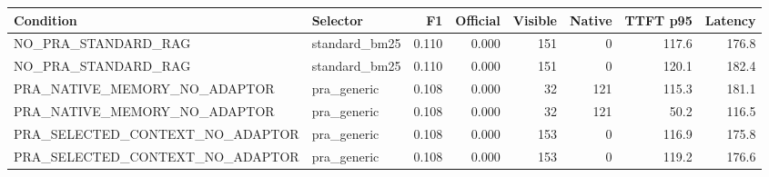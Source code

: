 \begin{tabular}{llrrrrrr}
\toprule
Condition & Selector & F1 & Official & Visible & Native & TTFT p95 & Latency \\
\midrule
NO\_PRA\_STANDARD\_RAG & standard\_bm25 & 0.110 & 0.000 & 151 & 0 & 117.6 & 176.8 \\
NO\_PRA\_STANDARD\_RAG & standard\_bm25 & 0.110 & 0.000 & 151 & 0 & 120.1 & 182.4 \\
PRA\_NATIVE\_MEMORY\_NO\_ADAPTOR & pra\_generic & 0.108 & 0.000 & 32 & 121 & 115.3 & 181.1 \\
PRA\_NATIVE\_MEMORY\_NO\_ADAPTOR & pra\_generic & 0.108 & 0.000 & 32 & 121 & 50.2 & 116.5 \\
PRA\_SELECTED\_CONTEXT\_NO\_ADAPTOR & pra\_generic & 0.108 & 0.000 & 153 & 0 & 116.9 & 175.8 \\
PRA\_SELECTED\_CONTEXT\_NO\_ADAPTOR & pra\_generic & 0.108 & 0.000 & 153 & 0 & 119.2 & 176.6 \\
\bottomrule
\end{tabular}
